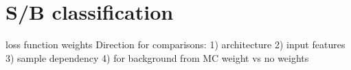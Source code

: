 \section{S/B classification}

loss function weights
Direction for comparisons:
		1) architecture
		2) input features
		3) sample dependency
		4) for background from MC weight vs no weights
